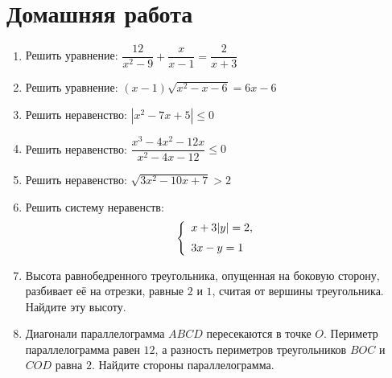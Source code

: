 \documentclass[12pt, a5paper]{article}
\begin{document}
	
\cfoot{}
\section*{Домашняя работа}
\begin{enumerate}
	\item Решить уравнение: \( \dfrac{12}{x^2-9}+\dfrac{x}{x-1}=\dfrac{2}{x+3} \)
	\item Решить уравнение: \( (x-1)\sqrt{x^2-x-6}=6x-6 \)
	\item Решить неравенство: \( |x^2-7x+5|\leqslant 0 \)
	\item Решить неравенство: \( \dfrac{x^3-4x^2-12x}{x^2-4x-12}\leqslant 0 \)
	\item Решить неравенство: \( \sqrt{3x^2-10x+7}>2 \)
	\item Решить систему неравенств:
	$$\left\{
	\begin{array}{l}
		x+3|y| = 2,\vspace{0,2cm}\\
		3x-y=1
	\end{array}
	\right.$$
	\item Высота равнобедренного треугольника, опущенная на боковую сторону, разбивает её на отрезки, равные \( 2 \) и \( 1 \), считая от вершины треугольника. Найдите эту высоту.
	\item Диагонали параллелограмма \( ABCD \) пересекаются в точке \( O \). Периметр параллелограмма равен \( 12 \), а разность периметров треугольников \( BOC \) и \( COD \) равна \( 2 \). Найдите стороны
	параллелограмма.
\end{enumerate}
\end{document}
